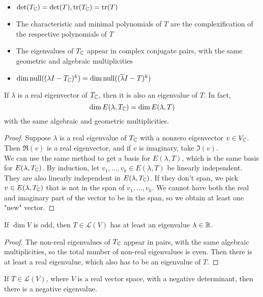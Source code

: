 \documentclass[12pt]{article}
\begin{document}
\begin{itemize}
    \item $\det(T_{\mathbb{C}}) = \det(T), \operatorname{tr}(T_{\mathbb{C}}) = \operatorname{tr}(T)$
    \item The characteristic and minimal polynomials of $T$ are the complexification of the respective polynomials of $T$
    \item The eigenvalues of $T_{\mathbb{C}}$ appear in complex conjugate pairs, with the same geometric and algebraic multiplicities
    \item $\dim\text{null}((\lambda I - T_{\mathbb{C}})^k) = \dim\text{null}((\overline \lambda I - T)^k)$
\end{itemize}

If $\lambda$ is a real eigenvector of $T_{\mathbb{C}}$, then it is also an eigenvalue of $T$. In fact,
$$\dim E(\lambda,T_{\mathbb{C}}) = \dim E(\lambda,T)$$
with the same algebraic and geometric multiplicities.

\begin{proof}
    Suppose $\lambda$ is a real eigenvalue of $T_{\mathbb{C}}$ with a nonzero eigenvector $v \in V_{\mathbb{C}}$. Then $\Re(v)$ is a real eigenvector, and if $v$ is imaginary, take $\Im(v)$. \\

We can use the same method to get a basis for $E(\lambda,T)$, which is the same basis for $E(\lambda,T_{\mathbb{C}})$. By induction, let $v_1,\dots,v_k \in E(\lambda,T)$ be linearly independent. They are also linearly independent in $E(\lambda,T_{\mathbb{C}})$. If they don't span, we pick $v \in E(\lambda,T_{\mathbb{C}})$ that is not in the span of $v_1,\dots,v_k$. We cannot have both the real and imaginary part of the vector to be in the span, so we obtain at least one "new" vector.
\end{proof}

\begin{prop}
    If $\dim V$ is odd, then $T \in \mathcal L(V)$ has at least an eigenvalue $\lambda \in \mathbb{R}$.
\end{prop}

\begin{proof}
    The non-real eigenvalues of $T_{\mathbb{C}}$ appear in pairs, with the same algebraic multiplicities, so the total number of non-real eigenvalues is even. Then there is at least a real eigenvalue, which also has to be an eigenvalue of $T$.
\end{proof}

\begin{prop}
    If $T \in \mathcal L(V)$, where $V$ is a real vector space, with a negative determinant, then there is a negative eigenvalue.
\end{prop}
\end{document}
